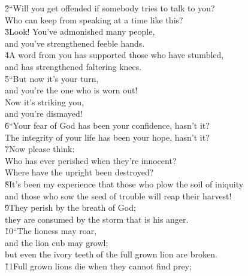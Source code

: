 \begin{poetry}
\poeml \v{2}``Will you get offended if somebody tries to talk to you? \\
\poemll    Who can keep from speaking at a time like this? \\
\poeml \v{3}Look! You've admonished many people, \\
\poemll    and you've strengthened feeble hands. \\
\poeml \v{4}A word from you has supported those who have stumbled, \\
\poemll    and has strengthened faltering knees. \\
\poeml \v{5}``But now it's your turn, \\
\poemll    and you're the one who is worn out! \\
\poeml Now it's striking you, \\
\poemll    and you're dismayed! \\
\poeml \v{6}``Your fear of God has been your confidence, hasn't it? \\
\poemll    The integrity of your life has been your hope, hasn't it? \\
\poeml \v{7}Now please think: \\
\poemll    Who has ever perished when they're innocent? \\
\poemlll       Where have the upright been destroyed? \\
\poeml \v{8}It's been my experience that those who plow the soil of iniquity \\
\poemll    and those who sow the seed of trouble will reap their harvest! \\
\poeml \v{9}They perish by the breath of God; \\
\poemll    they are consumed by the storm that is his anger. \\
\poeml \v{10}``The lioness may roar, \\
\poemll    and the lion cub may growl; \\
\poemlll       but even the ivory teeth of the full grown lion are broken. \\
\poeml \v{11}Full grown lions die when they cannot find prey; \\

\end{poetry}
